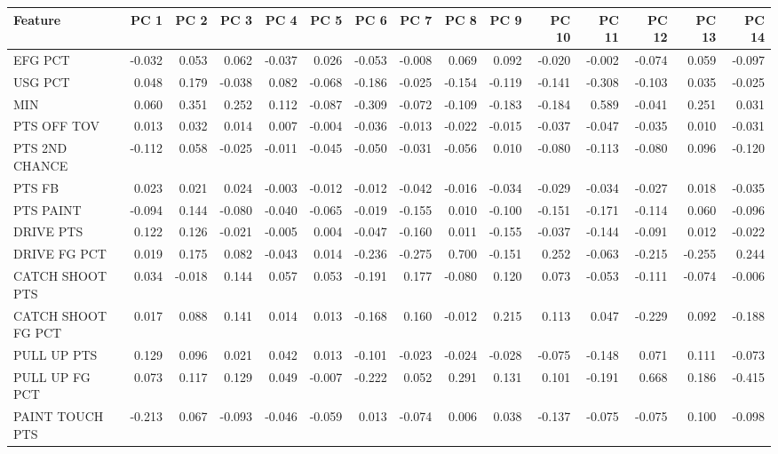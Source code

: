\begin{tabular}{lrrrrrrrrrrrrrr}
\toprule
Feature & PC 1 & PC 2 & PC 3 & PC 4 & PC 5 & PC 6 & PC 7 & PC 8 & PC 9 & PC 10 & PC 11 & PC 12 & PC 13 & PC 14 \\
\midrule
EFG PCT & -0.032 & 0.053 & 0.062 & -0.037 & 0.026 & -0.053 & -0.008 & 0.069 & 0.092 & -0.020 & -0.002 & -0.074 & 0.059 & -0.097 \\
USG PCT & 0.048 & 0.179 & -0.038 & 0.082 & -0.068 & -0.186 & -0.025 & -0.154 & -0.119 & -0.141 & -0.308 & -0.103 & 0.035 & -0.025 \\
MIN & 0.060 & 0.351 & 0.252 & 0.112 & -0.087 & -0.309 & -0.072 & -0.109 & -0.183 & -0.184 & 0.589 & -0.041 & 0.251 & 0.031 \\
PTS OFF TOV & 0.013 & 0.032 & 0.014 & 0.007 & -0.004 & -0.036 & -0.013 & -0.022 & -0.015 & -0.037 & -0.047 & -0.035 & 0.010 & -0.031 \\
PTS 2ND CHANCE & -0.112 & 0.058 & -0.025 & -0.011 & -0.045 & -0.050 & -0.031 & -0.056 & 0.010 & -0.080 & -0.113 & -0.080 & 0.096 & -0.120 \\
PTS FB & 0.023 & 0.021 & 0.024 & -0.003 & -0.012 & -0.012 & -0.042 & -0.016 & -0.034 & -0.029 & -0.034 & -0.027 & 0.018 & -0.035 \\
PTS PAINT & -0.094 & 0.144 & -0.080 & -0.040 & -0.065 & -0.019 & -0.155 & 0.010 & -0.100 & -0.151 & -0.171 & -0.114 & 0.060 & -0.096 \\
DRIVE PTS & 0.122 & 0.126 & -0.021 & -0.005 & 0.004 & -0.047 & -0.160 & 0.011 & -0.155 & -0.037 & -0.144 & -0.091 & 0.012 & -0.022 \\
DRIVE FG PCT & 0.019 & 0.175 & 0.082 & -0.043 & 0.014 & -0.236 & -0.275 & 0.700 & -0.151 & 0.252 & -0.063 & -0.215 & -0.255 & 0.244 \\
CATCH SHOOT PTS & 0.034 & -0.018 & 0.144 & 0.057 & 0.053 & -0.191 & 0.177 & -0.080 & 0.120 & 0.073 & -0.053 & -0.111 & -0.074 & -0.006 \\
CATCH SHOOT FG PCT & 0.017 & 0.088 & 0.141 & 0.014 & 0.013 & -0.168 & 0.160 & -0.012 & 0.215 & 0.113 & 0.047 & -0.229 & 0.092 & -0.188 \\
PULL UP PTS & 0.129 & 0.096 & 0.021 & 0.042 & 0.013 & -0.101 & -0.023 & -0.024 & -0.028 & -0.075 & -0.148 & 0.071 & 0.111 & -0.073 \\
PULL UP FG PCT & 0.073 & 0.117 & 0.129 & 0.049 & -0.007 & -0.222 & 0.052 & 0.291 & 0.131 & 0.101 & -0.191 & 0.668 & 0.186 & -0.415 \\
PAINT TOUCH PTS & -0.213 & 0.067 & -0.093 & -0.046 & -0.059 & 0.013 & -0.074 & 0.006 & 0.038 & -0.137 & -0.075 & -0.075 & 0.100 & -0.098 \\

\end{tabular}
